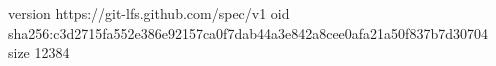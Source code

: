 version https://git-lfs.github.com/spec/v1
oid sha256:c3d2715fa552e386e92157ca0f7dab44a3e842a8cee0afa21a50f837b7d30704
size 12384
